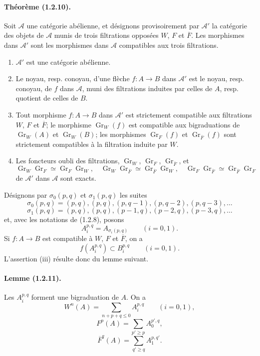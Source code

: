 \documentclass[10pt]{article}
\newcommand{\Gr}{\operatorname{Gr}}
\newcommand{\fg}{\guillemotright}
\newcommand{\og}{\guillemotleft}
\newcommand{\calA}{\mathcal A}
\begin{document}
\paragraph{Théorème (1.2.10).} Soit $\calA$ une catégorie abélienne, et désignons provisoirement par $\calA'$ la catégorie des objets de $\calA$ munis de trois filtrations opposées $W$, $F$ et $\overline F$. Les morphismes dans $\calA'$ sont les morphismes dans $\calA$ compatibles aux trois filtrations.
\begin{enumerate}[label=(\roman*)]
\item $\calA'$ est une catégorie abélienne.
\item Le noyau, resp. conoyau, d'une flèche $f:A\to B$ dans $\calA'$ est le noyau, resp. conoyau, de $f$ dans $\calA$, muni des filtrations induites par celles de $A$, resp. quotient de celles de $B$.
\item Tout morphisme $f:A\to B$ dans $\calA'$ est strictement compatible aux filtrations $W$, $F$ et $\overline F$; le morphisme $\Gr_W(f)$ est compatible aux bigraduations de $\Gr_W(A)$ et $\Gr_W(B)$; les morphismes $\Gr_F(f)$ et $\Gr_{\overline F}(f)$ sont strictement compatibles à la filtration induite par $W$.
\item Les foncteurs \og oubli des filtrations\fg{}, $\Gr_W$, $\Gr_F$, $\Gr_{\overline F}$, et
\[
\Gr_W\Gr_F\simeq\Gr_F\Gr_W,
\quad
\Gr_W\Gr_{\overline F}\simeq\Gr_{\overline F}\Gr_W,
\quad
\Gr_F\Gr_{\overline F}\simeq\Gr_{\overline F}\Gr_F
\]
de $\calA'$ dans $\calA$ sont exacts.
\end{enumerate}

Désignons par $\sigma_0(p,q)$ et $\sigma_1(p,q)$ les suites
\[
\sigma_0(p,q)=(p,q),(p,q),(p,q-1),(p,q-2),(p,q-3),\ldots
\]
\[
\sigma_1(p,q)=(p,q),(p,q),(p-1,q),(p-2,q),(p-3,q),\ldots
\]
et, avec les notations de (1.2.8), posons
\[
A_i^{p,q}=A_{\sigma_i(p,q)}\qquad(i=0,1).
\]
Si $f:A\to B$ est compatible à $W$, $F$ et $\overline F$, on a
\[
\tag{1.2.10.1}
f(A_i^{p,q})\subset B_i^{p,q}\qquad(i=0,1).
\]
L'assertion (iii) résulte donc du lemme suivant.

\paragraph{Lemme (1.2.11).} Les $A_i^{p,q}$ forment une bigraduation de $A$. On a
\[
\tag{1.2.11.1}
W^n(A)=\sum_{n+p+q\le0} A_i^{p,q}\qquad(i=0,1),
\]
\[
\tag{1.2.11.2}
F^p(A)=\sum_{p'\ge p} A_0^{p',q},
\]
\[
\tag{1.2.11.3}
\overline F^q(A)=\sum_{q'\ge q} A_1^{p,q'}.
\]
\end{document}
